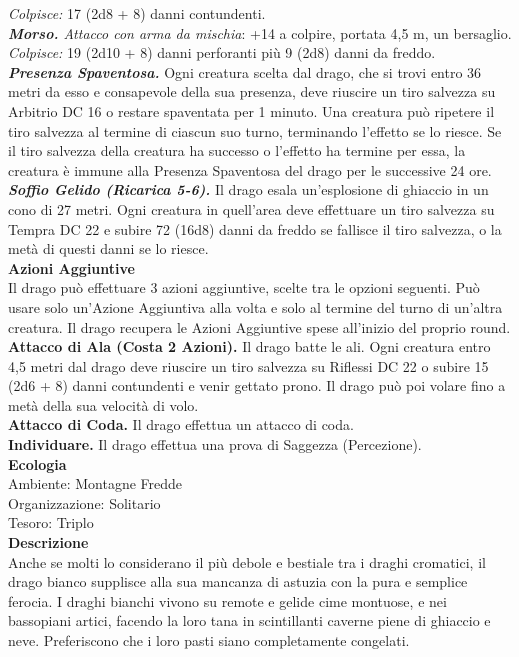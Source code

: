 \begin{multicols}{2}
\emph{Colpisce:} 17 (2d8 + 8) danni contundenti. \\
\emph{\textbf{Morso.} Attacco con arma da mischia}: +14 a colpire, portata 4,5 m, un bersaglio.\\
\emph{Colpisce:} 19 (2d10 + 8) danni perforanti più 9 (2d8) danni da freddo.\\
\emph{\textbf{Presenza Spaventosa.}} Ogni creatura scelta dal drago, che si trovi entro 36 metri da esso e consapevole della sua presenza, deve riuscire un tiro salvezza su Arbitrio DC 16 o restare spaventata per 1 minuto. Una creatura può ripetere il tiro salvezza al termine di ciascun suo turno, terminando l'effetto se lo riesce. Se il tiro salvezza della creatura ha successo o l'effetto ha termine per essa, la creatura è immune alla Presenza Spaventosa del drago per le successive 24 ore.\\
\emph{\textbf{Soffio Gelido (Ricarica 5-6).}} Il drago esala un'esplosione di ghiaccio in un cono di 27 metri. Ogni creatura in quell'area deve effettuare un tiro salvezza su Tempra DC 22 e subire 72 (16d8) danni da freddo se fallisce il tiro salvezza, o la metà di questi danni se lo riesce.\\
\textbf{Azioni Aggiuntive}\\
Il drago può effettuare 3 azioni aggiuntive, scelte tra le opzioni seguenti. Può usare solo un'Azione Aggiuntiva alla volta e solo al termine del turno di un'altra creatura. Il drago recupera le Azioni Aggiuntive spese all'inizio del proprio round.\\
\textbf{Attacco di Ala (Costa 2 Azioni).} Il drago batte le ali. Ogni creatura entro 4,5 metri dal drago deve riuscire un tiro salvezza su Riflessi DC 22 o subire 15 (2d6 + 8) danni contundenti e venir gettato prono. Il drago può poi volare fino a metà della sua velocità di volo.\\
\textbf{Attacco di Coda.} Il drago effettua un attacco di coda.\\
\textbf{Individuare.} Il drago effettua una prova di Saggezza (Percezione).\\
\textbf{Ecologia}\\
Ambiente: Montagne Fredde\\
Organizzazione: Solitario\\
Tesoro: Triplo\\
\textbf{Descrizione}\\
Anche se molti lo considerano il più debole e bestiale tra i draghi cromatici, il drago bianco supplisce alla sua mancanza di astuzia con la pura e semplice ferocia. I draghi bianchi vivono su remote e gelide cime montuose, e nei bassopiani artici, facendo la loro tana in scintillanti caverne piene di ghiaccio e neve. Preferiscono che i loro pasti siano completamente congelati.\\



\end{multicols}
